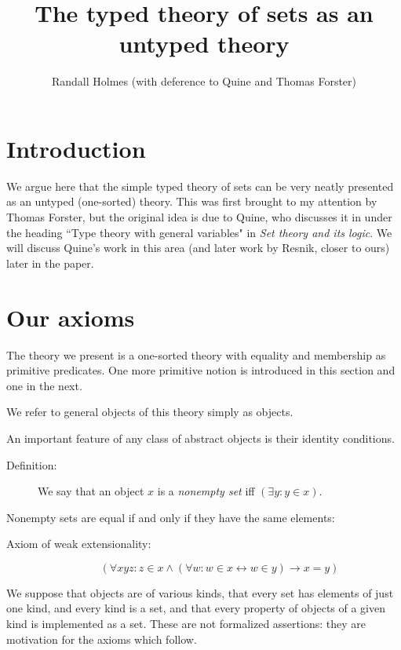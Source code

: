 \documentclass[12pt]{article}
\title{The typed theory of sets as an untyped theory}
\author{Randall Holmes (with deference to Quine and Thomas Forster)}
\begin{document}
\maketitle

\tableofcontents

\section{Introduction}

We argue here that the simple typed theory of sets can be very neatly presented as an untyped (one-sorted) theory.  This was first brought to my attention by Thomas Forster, but the original idea is due to Quine, who discusses it in under the heading ``Type theory with general variables" in {\em Set theory and its logic\/}.   We will discuss Quine's work in this area (and later work by Resnik, closer to ours) later in the paper.

\section{Our axioms}

The theory we present is a one-sorted theory with equality and membership as primitive predicates.  One more primitive notion is introduced in this section and one in the next.

We refer to general objects of this theory simply as objects.

An important feature of any class of abstract objects is their identity conditions.

\begin{description}

\item[Definition:]  We say that an object $x$ is a {\em nonempty set\/} iff $(\exists y:y \in x)$.

\end{description}

Nonempty sets are equal if and only if they have the same elements:

\begin{description}

\item[Axiom of weak extensionality:]  $$(\forall xyz:z \in x \wedge (\forall w:w \in x \leftrightarrow w \in y) \rightarrow x=y)$$

\end{description}

We suppose that objects are of various kinds, that every set has elements of just one kind, and every kind is a set,
and that every property of objects of a given kind is implemented as a set.  These are not formalized assertions:  they are motivation for the axioms which follow.
\end{document}

